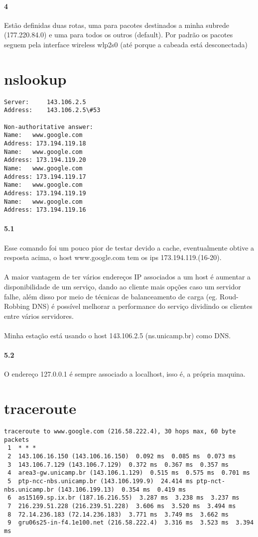 \documentclass{article}
\begin{document}
\paragraph{4} Estão definidas duas rotas, uma para pacotes destinados a minha subrede (177.220.84.0) e uma para todos os outros (default). Por padrão os pacotes seguem pela interface wireless wlp2s0 (até porque a cabeada está desconectada)
\section*{nslookup}
\begin{verbatim}
Server:		143.106.2.5
Address:	143.106.2.5\#53

Non-authoritative answer:
Name:	www.google.com
Address: 173.194.119.18
Name:	www.google.com
Address: 173.194.119.20
Name:	www.google.com
Address: 173.194.119.17
Name:	www.google.com
Address: 173.194.119.19
Name:	www.google.com
Address: 173.194.119.16
\end{verbatim}
\paragraph{5.1} Esse comando foi um pouco pior de testar devido a
cache, eventualmente obtive a resposta acima, o host www.google.com
tem os ips 173.194.119.(16-20).
\paragraph{} A maior vantagem de ter vários endereços IP associados a um
host é aumentar a disponibilidade de um serviço, dando ao cliente mais
opções caso um servidor falhe, além disso por meio de técnicas de
balanceamento de carga (eg. Roud-Robbing DNS) é possível melhorar a
performance do serviço dividindo os clientes entre vários servidores.
\paragraph{} Minha estação está usando o host 143.106.2.5
(ns.unicamp.br) como DNS.
\paragraph{5.2} O endereço 127.0.0.1 é sempre associado a
localhost, isso é, a própria maquina.
\section*{traceroute}
\begin{verbatim}
traceroute to www.google.com (216.58.222.4), 30 hops max, 60 byte packets
 1  * * *
 2  143.106.16.150 (143.106.16.150)  0.092 ms  0.085 ms  0.073 ms
 3  143.106.7.129 (143.106.7.129)  0.372 ms  0.367 ms  0.357 ms
 4  area3-gw.unicamp.br (143.106.1.129)  0.515 ms  0.575 ms  0.701 ms
 5  ptp-ncc-nbs.unicamp.br (143.106.199.9)  24.414 ms ptp-nct-nbs.unicamp.br (143.106.199.13)  0.354 ms  0.419 ms
 6  as15169.sp.ix.br (187.16.216.55)  3.287 ms  3.238 ms  3.237 ms
 7  216.239.51.228 (216.239.51.228)  3.606 ms  3.520 ms  3.494 ms
 8  72.14.236.183 (72.14.236.183)  3.771 ms  3.749 ms  3.662 ms
 9  gru06s25-in-f4.1e100.net (216.58.222.4)  3.316 ms  3.523 ms  3.394 ms
\end{verbatim}
\end{document}
